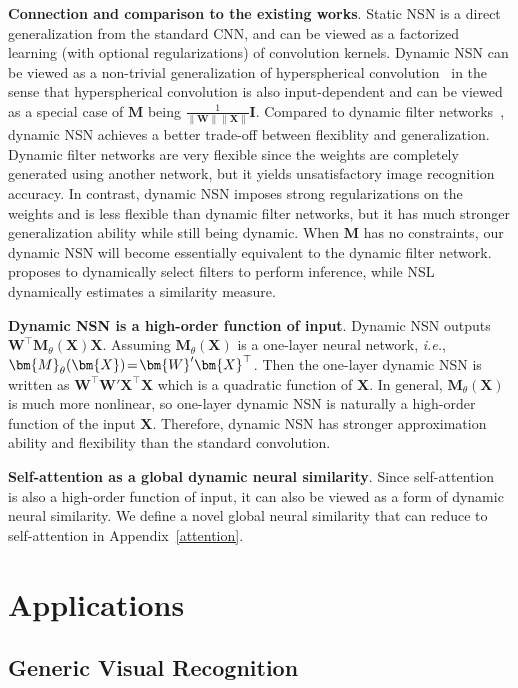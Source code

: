 \textbf{Connection and comparison to the existing works}. Static NSN is a direct generalization from the standard CNN, and can be viewed as a factorized learning (with optional regularizations) of convolution kernels. Dynamic NSN can be viewed as a non-trivial generalization of hyperspherical convolution~\cite{liu2017hyper} in the sense that hyperspherical convolution is also input-dependent and can be viewed as a special case of $\bm{M}$ being $\frac{1}{\|\bm{W}\|\|\bm{X}\|}\bm{I}$. Compared to dynamic filter networks~\cite{jia2016dynamic}, dynamic NSN achieves a better trade-off between flexiblity and generalization. Dynamic filter networks are very flexible since the weights are completely generated using another network, but it yields unsatisfactory image recognition accuracy. In contrast, dynamic NSN imposes strong regularizations on the weights and is less flexible than dynamic filter networks, but it has much stronger generalization ability while still being dynamic. When $\bm{M}$ has no constraints, our dynamic NSN will become essentially equivalent to the dynamic filter network. \cite{chen2018gaternet} proposes to dynamically select filters to perform inference, while NSL dynamically estimates a similarity measure.
\par
\textbf{Dynamic NSN is a high-order function of input}. Dynamic NSN outputs $\bm{W}^\top\bm{M}_\theta(\bm{X})\bm{X}$. Assuming $\bm{M}_\theta(\bm{X})$ is a one-layer neural network, \emph{i.e.}, $\thickmuskip=2mu \medmuskip=2mu \bm{M}_\theta(\bm{X})=\bm{W}'\bm{X}^\top$. Then the one-layer dynamic NSN is written as $\bm{W}^\top\bm{W}'\bm{X}^\top\bm{X}$ which is a quadratic function of $\bm{X}$. In general,  $\bm{M}_\theta(\bm{X})$ is much more nonlinear, so one-layer dynamic NSN is naturally a high-order function of the input $\bm{X}$. Therefore, dynamic NSN has stronger approximation ability and flexibility than the standard convolution.

\par
\textbf{Self-attention as a global dynamic neural similarity}. Since self-attention~\cite{zhang2018self} is also a high-order function of input, it can also be viewed as a form of dynamic neural similarity. We define a novel global neural similarity that can reduce to self-attention in Appendix~\ref{attention}.

\section{Applications}

\subsection{Generic Visual Recognition}\label{reco}


